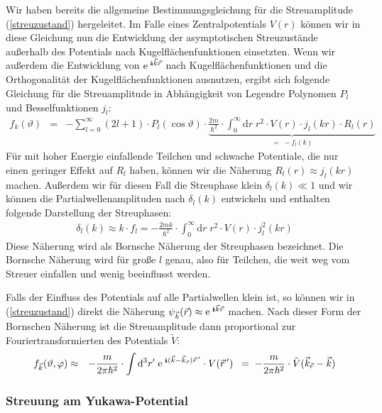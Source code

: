 Wir haben bereits die allgemeine Bestimmungsgleichung für die Streuamplitude (\ref{streuzustand}) hergeleitet. Im Falle eines Zentralpotentials $V(r)$ können wir in diese Gleichung nun die Entwicklung der asymptotischen Streuzustände außerhalb des Potentials nach Kugelflächenfunktionen einsetzten. Wenn wir außerdem die Entwicklung von $\e^{\;\I \vec{k}\vec{r}}$ nach Kugelflächenfunktionen und die Orthogonalität der Kugelflächenfunktionen ausnutzen, ergibt sich folgende Gleichung für die Streuamplitude in Abhängigkeit von Legendre Polynomen $P_l$ und Besselfunktionen $j_l$: 
\begin{eqnarray*}
	f_k(\vartheta) &=& -\sum_{l = 0}^{\infty} (2l+1)\cdot P_l(\cos\vartheta)\cdot \underbrace{\frac {2 m}{\hbar^2}\cdot\int_0^{\infty}\!\! \mathrm{d}r\;r^2\cdot V(r) \cdot j_l(kr)\cdot R_l(r)}_{=\;-f_l(k)} 
\end{eqnarray*}
Für mit hoher Energie einfallende Teilchen und schwache Potentiale, die nur einen geringer Effekt auf $R_l$ haben, können wir die Näherung $R_l(r)\approx j_l(kr)$ machen. Außerdem wir für diesen Fall die Streuphase klein $\delta_l(k)\ll1$ und wir können die Partialwellenamplituden nach $\delta_l(k)$ entwickeln und enthalten folgende Darstellung der Streuphasen: 
\begin{eqnarray*}
	\delta_l(k) \approx k\cdot f_l = -\frac{2mk}{\hbar^2}\cdot \int_0^{\infty}\!\! \mathrm{d}r\; r^2\cdot V(r)\cdot j^2_l(kr)
\end{eqnarray*}
Diese Näherung wird als Bornsche Näherung der Streuphasen bezeichnet. Die Bornsche Näherung wird für große $l$ genau, also für Teilchen, die weit weg vom Streuer einfallen und wenig beeinflusst werden. 

Falls der Einfluss des Potentials auf alle Partialwellen klein ist,
so können wir in (\ref{streuzustand}) direkt die Näherung $\psi_{\vec{k}}(\vec{r})\approx\e^{\;\I\vec{k}\vec{r}}$ machen. Nach dieser Form der Bornschen Näherung ist die Streuamplitude dann proportional zur Fouriertransformierten des Potentials $\tilde{V}$: 
\begin{eqnarray*}
	f_{\vec{k}}(\vartheta,\varphi) &\approx& -\frac{m}{2\pi\hbar^2}\cdot \int \mathrm{d}^3r'\; \e^{\;\I(\vec{k}-\vec{k}_{\vec{r}})\vec{r}\,'}\cdot V(\vec{r}\,') \;\;=\; -\frac{m}{2\pi\hbar^2}\cdot \tilde{V}(\vec{k}_{\vec{r}}-\vec{k})
\end{eqnarray*}


\subsubsection{Streuung am Yukawa-Potential}

